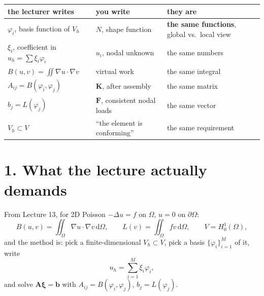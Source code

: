 \documentclass[11pt]{article}
\newcommand{\dOm}{\,\mathrm{d}\Omega}
\newcommand{\grad}{\nabla}
\newcommand{\lap}{\Delta}
\newcommand{\mth}[1]{\textcolor{MathC}{#1}}
\newcommand{\eng}[1]{\textcolor{EngC}{#1}}
\begin{document}
\begin{center}\small
\renewcommand{\arraystretch}{1.3}
\begin{tabular}{@{}lll@{}}
\toprule
\mth{the lecturer writes} & \eng{you write} & they are\\
\midrule
$\varphi_{i}$, basis function of $V_{h}$ & $N$, shape function & \textbf{the same functions}, global vs.\ local view\\
$\xi_{i}$, coefficient in $u_{h}=\sum\xi_{i}\varphi_{i}$ & $u_{i}$, nodal unknown & the same numbers\\
$B(u,v)=\iint\grad u\cdot\grad v$ & virtual work & the same integral\\
$A_{ij}=B(\varphi_{i},\varphi_{j})$ & $\bm{K}$, after assembly & the same matrix\\
$b_{j}=L(\varphi_{j})$ & $\bm{F}$, consistent nodal loads & the same vector\\
$V_{h}\subset V$ & ``the element is conforming'' & the same requirement\\
\bottomrule
\end{tabular}
\label{tab:dict}
\end{center}

\section*{1. What the lecture actually demands}

From Lecture 13, for 2D Poisson $-\lap u=f$ on $\Omega$, $u=0$ on
$\partial\Omega$:
\begin{equation}\label{eq:weak}
  B(u,v)=\iint_{\Omega}\grad u\cdot\grad v\dOm,
  \qquad
  L(v)=\iint_{\Omega}f v\dOm,
  \qquad
  V=H^{1}_{0}(\Omega),
\end{equation}
and the method is: pick a finite-dimensional $V_{h}\subset V$, pick a basis
$\{\varphi_{i}\}_{i=1}^{M}$ of it, write
\begin{equation}\label{eq:uh}
  u_{h}=\sum_{i=1}^{M}\xi_{i}\varphi_{i},
\end{equation}
and solve $\bm{A}\bm{\xi}=\bm{b}$ with
$A_{ij}=B(\varphi_{i},\varphi_{j})$, $b_{j}=L(\varphi_{j})$.
\end{document}

